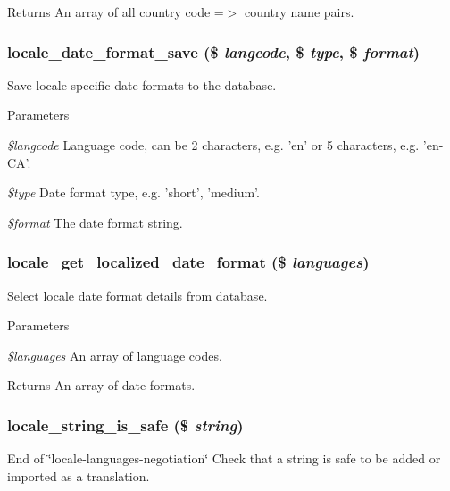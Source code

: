 \begin{DoxyReturn}{Returns}
An array of all country code =$>$ country name pairs. 
\end{DoxyReturn}
\hypertarget{locale_8inc_ac9cf4c832fb3fda77e42b0553e0289de}{
\subsubsection[{locale\_\-date\_\-format\_\-save}]{\setlength{\rightskip}{0pt plus 5cm}locale\_\-date\_\-format\_\-save (\$ {\em langcode}, \/  \$ {\em type}, \/  \$ {\em format})}}
\label{locale_8inc_ac9cf4c832fb3fda77e42b0553e0289de}
Save locale specific date formats to the database.


\begin{DoxyParams}{Parameters}
\item[{\em \$langcode}]Language code, can be 2 characters, e.g. 'en' or 5 characters, e.g. 'en-\/CA'. \item[{\em \$type}]Date format type, e.g. 'short', 'medium'. \item[{\em \$format}]The date format string. \end{DoxyParams}
\hypertarget{locale_8inc_a1e11debad1c66255e8a096ef09dde589}{
\subsubsection[{locale\_\-get\_\-localized\_\-date\_\-format}]{\setlength{\rightskip}{0pt plus 5cm}locale\_\-get\_\-localized\_\-date\_\-format (\$ {\em languages})}}
\label{locale_8inc_a1e11debad1c66255e8a096ef09dde589}
Select locale date format details from database.


\begin{DoxyParams}{Parameters}
\item[{\em \$languages}]An array of language codes.\end{DoxyParams}
\begin{DoxyReturn}{Returns}
An array of date formats. 
\end{DoxyReturn}
\hypertarget{locale_8inc_a60fba74a6fc736cec4df566aa165ca14}{
\subsubsection[{locale\_\-string\_\-is\_\-safe}]{\setlength{\rightskip}{0pt plus 5cm}locale\_\-string\_\-is\_\-safe (\$ {\em string})}}
\label{locale_8inc_a60fba74a6fc736cec4df566aa165ca14}
End of \char`\"{}locale-\/languages-\/negotiation\char`\"{} Check that a string is safe to be added or imported as a translation.


